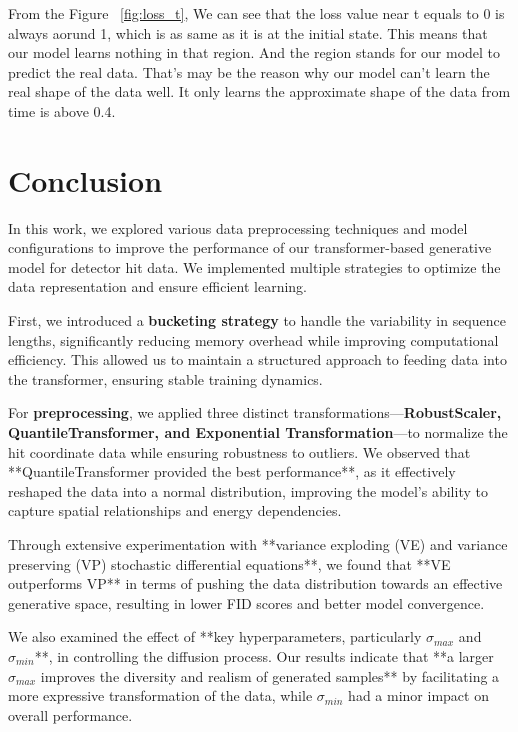 From the Figure ~\ref{fig:loss_t}, We can see that the loss value near t equals to 0 is always aorund 1, which is as same as it is at the initial state. This means that our model learns nothing in that region. And the region stands for our model to predict the real data. That's may be the reason why our model can't learn the real shape of the data well. It only learns the approximate shape of the data from time is above 0.4.

\section{Conclusion}

In this work, we explored various data preprocessing techniques and model configurations to improve the performance of our transformer-based generative model for detector hit data. We implemented multiple strategies to optimize the data representation and ensure efficient learning.

First, we introduced a \textbf{bucketing strategy} to handle the variability in sequence lengths, significantly reducing memory overhead while improving computational efficiency. This allowed us to maintain a structured approach to feeding data into the transformer, ensuring stable training dynamics.

For \textbf{preprocessing}, we applied three distinct transformations—\textbf{RobustScaler, QuantileTransformer, and Exponential Transformation}—to normalize the hit coordinate data while ensuring robustness to outliers. We observed that **QuantileTransformer provided the best performance**, as it effectively reshaped the data into a normal distribution, improving the model's ability to capture spatial relationships and energy dependencies.

Through extensive experimentation with **variance exploding (VE) and variance preserving (VP) stochastic differential equations**, we found that **VE outperforms VP** in terms of pushing the data distribution towards an effective generative space, resulting in lower FID scores and better model convergence.

We also examined the effect of **key hyperparameters, particularly $\sigma_{max}$ and $\sigma_{min}$**, in controlling the diffusion process. Our results indicate that **a larger $\sigma_{max}$ improves the diversity and realism of generated samples** by facilitating a more expressive transformation of the data, while $\sigma_{min}$ had a minor impact on overall performance.

